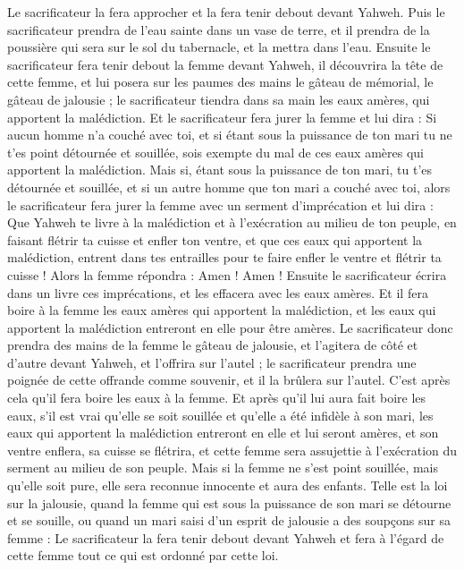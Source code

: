 \begin{multicols}{2}
Le sacrificateur la fera approcher et la fera tenir debout devant Yahweh.
Puis le sacrificateur prendra de l'eau sainte dans un vase de terre, et il prendra de la poussière qui sera sur le sol du tabernacle, et la mettra dans l'eau.
Ensuite le sacrificateur fera tenir debout la femme devant Yahweh, il découvrira la tête de cette femme, et lui posera sur les paumes des mains le gâteau de mémorial, le gâteau de jalousie ; le sacrificateur tiendra dans sa main les eaux amères, qui apportent la malédiction.
Et le sacrificateur fera jurer la femme et lui dira : Si aucun homme n'a couché avec toi, et si étant sous la puissance de ton mari tu ne t'es point détournée et souillée, sois exempte du mal de ces eaux amères qui apportent la malédiction.
Mais si, étant sous la puissance de ton mari, tu t'es détournée et souillée, et si un autre homme que ton mari a couché avec toi,
alors le sacrificateur fera jurer la femme avec un serment d'imprécation et lui dira : Que Yahweh te livre à la malédiction et à l'exécration au milieu de ton peuple, en faisant flétrir ta cuisse et enfler ton ventre,
et que ces eaux qui apportent la malédiction, entrent dans tes entrailles pour te faire enfler le ventre et flétrir ta cuisse ! Alors la femme répondra : Amen ! Amen !
Ensuite le sacrificateur écrira dans un livre ces imprécations, et les effacera avec les eaux amères.
Et il fera boire à la femme les eaux amères qui apportent la malédiction, et les eaux qui apportent la malédiction entreront en elle pour être amères.
Le sacrificateur donc prendra des mains de la femme le gâteau de jalousie, et l'agitera de côté et d'autre devant Yahweh, et l'offrira sur l'autel ;
le sacrificateur prendra une poignée de cette offrande comme souvenir, et il la brûlera sur l'autel. C'est après cela qu'il fera boire les eaux à la femme.
Et après qu'il lui aura fait boire les eaux, s'il est vrai qu'elle se soit souillée et qu'elle a été infidèle à son mari, les eaux qui apportent la malédiction entreront en elle et lui seront amères, et son ventre enflera, sa cuisse se flétrira, et cette femme sera assujettie à l'exécration du serment au milieu de son peuple.
Mais si la femme ne s'est point souillée, mais qu'elle soit pure, elle sera reconnue innocente et aura des enfants.
Telle est la loi sur la jalousie, quand la femme qui est sous la puissance de son mari se détourne et se souille,
ou quand un mari saisi d'un esprit de jalousie a des soupçons sur sa femme : Le sacrificateur la fera tenir debout devant Yahweh et fera à l'égard de cette femme tout ce qui est ordonné par cette loi.

\end{multicols}
